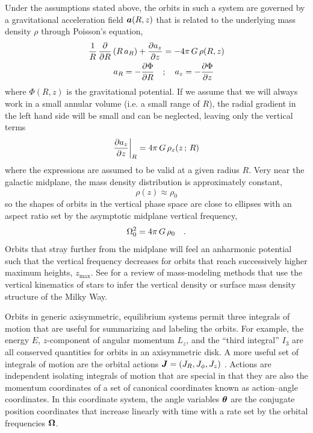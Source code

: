 Under the assumptions stated above, the orbits in such a system are governed by a
gravitational acceleration field $\boldsymbol{a}(R, z)$ that is related to the underlying mass
density $\rho$ through Poisson's equation,
\begin{align}
    \frac{1}{R} \, \frac{\partial {}}{\partial {R}}\left(R \, a_R\right) + \frac{\partial {a_z}}{\partial {z}}
        &= - 4\pi \, G \, \rho(R, z) \\
    a_R = -\frac{\partial {\Phi}}{\partial {R}} \quad &; \quad a_z = -\frac{\partial {\Phi}}{\partial {z}}
\end{align}
where $\Phi(R, z)$ is the gravitational potential.
If we assume that we will always work in a small annular volume (i.e. a small range of
$R$), the radial gradient in the left hand side will be small and can be neglected,
leaving only the vertical terms
\begin{equation}
    \frac{\partial {a_z}}{\partial {z}}\biggr\rvert_R = 4\pi \, G \, \rho_z(z \,;\, R)
\end{equation}
where the expressions are assumed to be valid at a given radius $R$.
Very near the galactic midplane, the mass density distribution is approximately
constant,
\begin{equation}
    \rho(z) \approx \rho_0
\end{equation}
so the shapes of orbits in the vertical phase space are close to ellipses with an aspect
ratio set by the asymptotic midplane vertical frequency,
\begin{equation}
    \Omega_0^2 = 4\pi\,G \, \rho_0 \quad . \label{eq:freqzero}
\end{equation}
Orbits that stray further from the midplane will feel an anharmonic potential such that
the vertical frequency decreases for orbits that reach successively higher maximum
heights, $z_{\textrm{max}}$.
See \citet{Read:2014} for a review of mass-modeling methods that use the vertical
kinematics of stars to infer the vertical density or surface mass density structure of
the Milky Way.

Orbits in generic axisymmetric, equilibrium systems permit three integrals of motion
that are useful for summarizing and labeling the orbits.
For example, the energy $E$, $z$-component of angular momentum $L_z$, and the ``third
integral'' $I_3$ are all conserved quantities for orbits in an axisymmetric disk.
A more useful set of integrals of motion are the orbital actions $\boldsymbol{J} = (J_R,
J_\phi, J_z)$ \citep{Binney:2008}.
Actions are independent isolating integrals of motion that are special in that they are
also the momentum coordinates of a set of canonical coordinates known as action--angle
coordinates.
In this coordinate system, the angle variables $\boldsymbol{\theta}$ are the conjugate position
coordinates that increase linearly with time with a rate set by the orbital frequencies
$\boldsymbol{\Omega}$.

